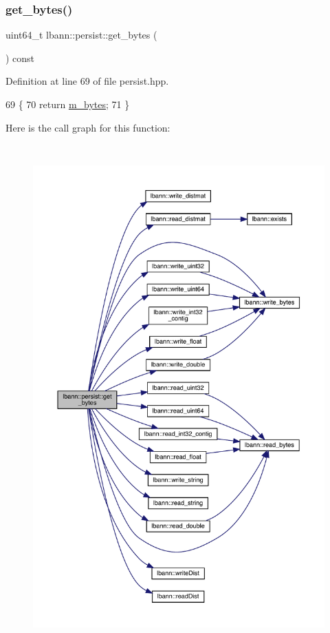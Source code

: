 \subsubsection{\texorpdfstring{get\+\_\+bytes()}{get\_bytes()}}
{\footnotesize\ttfamily uint64\+\_\+t lbann\+::persist\+::get\+\_\+bytes (\begin{DoxyParamCaption}{ }\end{DoxyParamCaption}) const\hspace{0.3cm}{\ttfamily [inline]}}



Definition at line 69 of file persist.\+hpp.


\begin{DoxyCode}
69                              \{
70     \textcolor{keywordflow}{return} \hyperlink{classlbann_1_1persist_a0bd4fd42d9858a5210c8034dfbb666d4}{m\_bytes};
71   \}
\end{DoxyCode}
Here is the call graph for this function\+:\nopagebreak
\begin{figure}[H]
\begin{center}
\leavevmode
\includegraphics[height=550pt]{classlbann_1_1persist_ad759657d69e88a491729ce8e4bf9510e_cgraph}
\end{center}
\end{figure}
